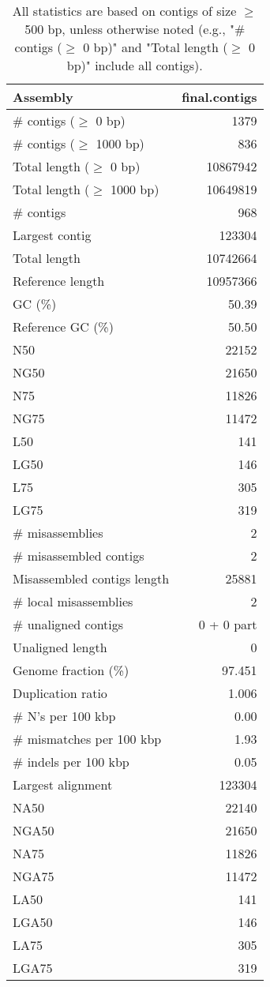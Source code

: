 \documentclass[12pt,a4paper]{article}
\begin{document}
\begin{table}[ht]
\begin{center}
\caption{All statistics are based on contigs of size $\geq$ 500 bp, unless otherwise noted (e.g., "\# contigs ($\geq$ 0 bp)" and "Total length ($\geq$ 0 bp)" include all contigs).}
\begin{tabular}{|l*{1}{|r}|}
\hline
Assembly & final.contigs \\ \hline
\# contigs ($\geq$ 0 bp) & 1379 \\ \hline
\# contigs ($\geq$ 1000 bp) & 836 \\ \hline
Total length ($\geq$ 0 bp) & 10867942 \\ \hline
Total length ($\geq$ 1000 bp) & 10649819 \\ \hline
\# contigs & 968 \\ \hline
Largest contig & 123304 \\ \hline
Total length & 10742664 \\ \hline
Reference length & 10957366 \\ \hline
GC (\%) & 50.39 \\ \hline
Reference GC (\%) & 50.50 \\ \hline
N50 & 22152 \\ \hline
NG50 & 21650 \\ \hline
N75 & 11826 \\ \hline
NG75 & 11472 \\ \hline
L50 & 141 \\ \hline
LG50 & 146 \\ \hline
L75 & 305 \\ \hline
LG75 & 319 \\ \hline
\# misassemblies & 2 \\ \hline
\# misassembled contigs & 2 \\ \hline
Misassembled contigs length & 25881 \\ \hline
\# local misassemblies & 2 \\ \hline
\# unaligned contigs & 0 + 0 part \\ \hline
Unaligned length & 0 \\ \hline
Genome fraction (\%) & 97.451 \\ \hline
Duplication ratio & 1.006 \\ \hline
\# N's per 100 kbp & 0.00 \\ \hline
\# mismatches per 100 kbp & 1.93 \\ \hline
\# indels per 100 kbp & 0.05 \\ \hline
Largest alignment & 123304 \\ \hline
NA50 & 22140 \\ \hline
NGA50 & 21650 \\ \hline
NA75 & 11826 \\ \hline
NGA75 & 11472 \\ \hline
LA50 & 141 \\ \hline
LGA50 & 146 \\ \hline
LA75 & 305 \\ \hline
LGA75 & 319 \\ \hline
\end{tabular}
\end{center}
\end{table}
\end{document}
